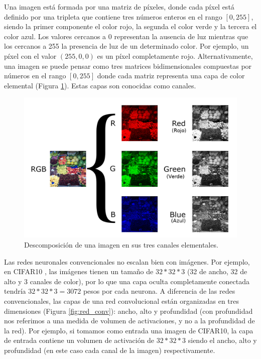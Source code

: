 \documentclass[spanish]{report}
\begin{document}
Una imagen está formada por una matriz de píxeles, donde cada píxel está definido por una tripleta que contiene tres números enteros en el rango $[0, 255]$, siendo la primer componente el color rojo, la segunda el color verde y la tercera el color azul. Los valores cercanos a 0 representan la ausencia de luz mientras que los cercanos a 255 la presencia de luz de un determinado color. Por ejemplo, un píxel con el valor $(255, 0, 0)$ es un píxel completamente rojo. Alternativamente, una imagen se puede pensar como tres matrices bidimensionales compuestas por números en el rango $[0, 255]$ donde cada matriz representa una capa de color elemental (Figura \ref{fig:img_capas_rgb}). Estas capas son conocidas como canales.

\begin{figure}[h]
\centering
 \includegraphics[width=\linewidth]{rgb_imagen.jpg}
   \caption[Descomposición de una imagen en sus tres canales elementales.]{Descomposición de una imagen en sus tres canales elementales. \protect\footnotemark}
  \label{fig:img_capas_rgb}
\end{figure}


Las redes neuronales convencionales no escalan bien con imágenes. Por ejemplo, en CIFAR10 \cite{cifar10}, las imágenes tienen un tamaño de $32*32*3$ (32 de ancho, 32 de alto y 3 canales de color), por lo que una capa oculta completamente conectada tendría $32*32*3=3072$ pesos por cada neurona. 
\newpage
A diferencia de las redes convencionales, las capas de una red convolucional están organizadas en tres dimensiones (Figura \ref{fig:red_conv}): ancho, alto y profundidad (con profundidad nos referimos a una medida de volumen de activaciones, y no a la profundidad de la red). Por ejemplo, si tomamos como entrada una imagen de CIFAR10, la capa de entrada contiene un volumen de activación de $32*32*3$ siendo el ancho, alto y profundidad (en este caso cada canal de la imagen) respectivamente. 
\end{document}
